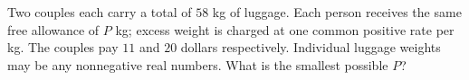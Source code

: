 Two couples each carry a total of $58$ kg of luggage. Each person receives the same free allowance of $P$ kg; excess weight is charged at one common positive rate per kg. The couples pay $11$ and $20$ dollars respectively. Individual luggage weights may be any nonnegative real numbers. What is the smallest possible $P$?
